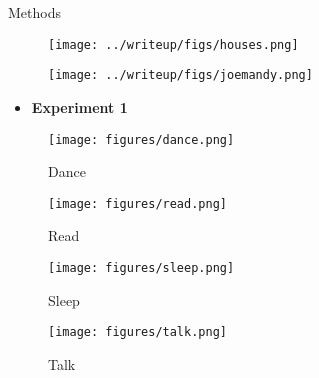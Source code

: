 \documentclass[final]{beamer}
\newlength{\colwidth}
\begin{document}
\begin{frame}[t]
\begin{columns}[t]
\begin{column}{\colwidth}
\begin{block}{Methods}
\begin{itemize}
    \end{itemize}

    \begin{figure}
      \texttt{[image: ../writeup/figs/houses.png]}
    \end{figure}
    
    \begin{figure}
      \hfill
      \texttt{[image: ../writeup/figs/joemandy.png]} \hspace{1in}
    \end{figure}

    \vspace{-0.8in}

    \begin{itemize}
      \item \textbf{Experiment 1}
    \end{itemize}
    \begin{figure}
      \begin{minipage}[t]{0.2\linewidth}
        \centering
        \texttt{[image: figures/dance.png]}
        \caption{Dance}
      \end{minipage}
      \begin{minipage}[t]{0.2\linewidth}
        \centering
        \texttt{[image: figures/read.png]}
        \caption{Read}
      \end{minipage}%
      \begin{minipage}[t]{0.2\linewidth}
        \centering
        \texttt{[image: figures/sleep.png]}
        \caption{Sleep}
      \end{minipage}
      \begin{minipage}[t]{0.2\linewidth}
        \centering
        \texttt{[image: figures/talk.png]}
        \caption{Talk}
      \end{minipage}
    \end{figure}    

    \vspace{-0.3in}


\end{block}
\end{column}
\end{columns}
\end{frame}
\end{document}
